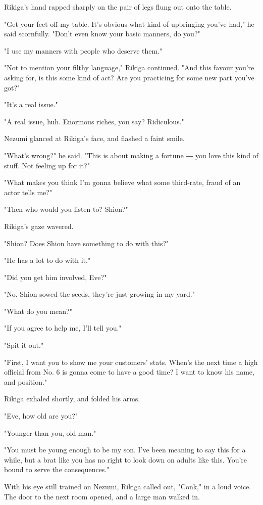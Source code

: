 Rikiga's hand rapped sharply on the pair of legs flung out onto the
table.

"Get your feet off my table. It's obvious what kind of upbringing you've
had," he said scornfully. "Don't even know your basic manners, do you?"

"I use my manners with people who deserve them."

"Not to mention your filthy language," Rikiga continued. "And this
favour you're asking for, is this some kind of act? Are you practicing
for some new part you've got?"

"It's a real issue."

"A real issue, huh. Enormous riches, you say? Ridiculous."

Nezumi glanced at Rikiga's face, and flashed a faint smile.

"What's wrong?" he said. "This is about making a fortune ― you love this
kind of stuff. Not feeling up for it?"

"What makes you think I'm gonna believe what some third-rate, fraud of
an actor tells me?"

"Then who would you listen to? Shion?"

Rikiga's gaze wavered.

"Shion? Does Shion have something to do with this?"

"He has a lot to do with it."

"Did you get him involved, Eve?"

"No. Shion sowed the seeds, they're just growing in my yard."

"What do you mean?"

"If you agree to help me, I'll tell you."

"Spit it out."

"First, I want you to show me your customers' stats. When's the next
time a high official from No. 6 is gonna come to have a good time? I
want to know his name, and position."

Rikiga exhaled shortly, and folded his arms.

"Eve, how old are you?"

"Younger than you, old man."

"You must be young enough to be my son. I've been meaning to say this
for a while, but a brat like you has no right to look down on adults
like this. You're bound to serve the consequences."

With his eye still trained on Nezumi, Rikiga called out, "Conk," in a
loud voice. The door to the next room opened, and a large man walked in.

